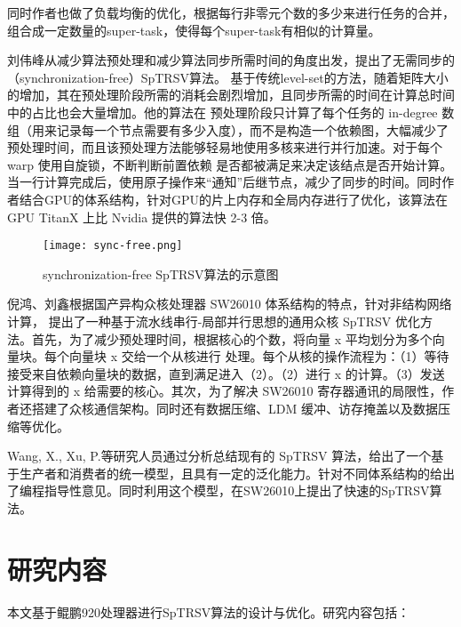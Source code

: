 同时作者也做了负载均衡的优化，根据每行非零元个数的多少来进行任务的合并，组合成一定数量的super-task，使得每个super-task有相似的计算量。

刘伟峰\cite{liuSyncFree2016,liuFastSynchronizationfreeAlgorithms2017}从减少算法预处理和减少算法同步所需时间的角度出发，提出了无需同步的（synchronization-free）SpTRSV算法。 基于传统level-set的方法，随着矩阵大小的增加，其在预处理阶段所需的消耗会剧烈增加，且同步所需的时间在计算总时间中的占比也会大量增加。他的算法在 预处理阶段只计算了每个任务的 in-degree 数组（用来记录每一个节点需要有多少入度），而不是构造一个依赖图，大幅减少了预处理时间，而且该预处理方法能够轻易地使用多核来进行并行加速。对于每个 warp 使用自旋锁，不断判断前置依赖 是否都被满足来决定该结点是否开始计算。当一行计算完成后，使用原子操作来“通知”后继节点，减少了同步的时间。同时作者结合GPU的体系结构，针对GPU的片上内存和全局内存进行了优化，该算法在 GPU TitanX 上比 Nvidia 提供的算法快 2-3 倍。

\begin{figure}[htbp]
    \centering
    \texttt{[image: sync-free.png]}
    \caption{synchronization-free SpTRSV算法的示意图}
    \label{sync-free}
\end{figure}

倪鸿、刘鑫\cite{nihong2019}根据国产异构众核处理器 SW26010 体系结构的特点，针对非结构网络计算， 提出了一种基于流水线串行-局部并行思想的通用众核 SpTRSV 优化方法。首先，为了减少预处理时间，根据核心的个数，将向量 x 平均划分为多个向量块。每个向量块 x 交给一个从核进行 处理。每个从核的操作流程为：（1）等待接受来自依赖向量块的数据，直到满足进入（2）。（2）进行 x 的计算。（3）发送计算得到的 x 给需要的核心。其次，为了解决 SW26010 寄存器通讯的局限性，作者还搭建了众核通信架构。同时还有数据压缩、LDM 缓冲、访存掩盖以及数据压缩等优化。

Wang, X., Xu, P.\cite{wangFastSparseTriangular2018}等研究人员通过分析总结现有的 SpTRSV 算法，给出了一个基于生产者和消费者的统一模型，且具有一定的泛化能力。针对不同体系结构的给出了编程指导性意见。同时利用这个模型，在SW26010上提出了快速的SpTRSV算法。

\section{研究内容}

本文基于鲲鹏920处理器进行SpTRSV算法的设计与优化。研究内容包括：

